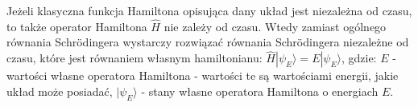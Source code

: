 Jeżeli klasyczna funkcja Hamiltona opisująca dany układ jest niezależna od czasu, to także operator Hamiltona $ \hat{H} $ nie zależy od czasu. Wtedy zamiast ogólnego równania Schrödingera wystarczy rozwiązać równania Schrödingera niezależne od czasu, które jest równaniem własnym hamiltonianu:\newline
$ \hat{H}|\psi_E\rangle = E|\psi_E\rangle $, gdzie:\newline
$ E $ -  wartości własne operatora Hamiltona - wartości te są wartościami energii, jakie układ może posiadać,\newline
$ |\psi_E\rangle $ - stany własne operatora Hamiltona o energiach $ E $.


